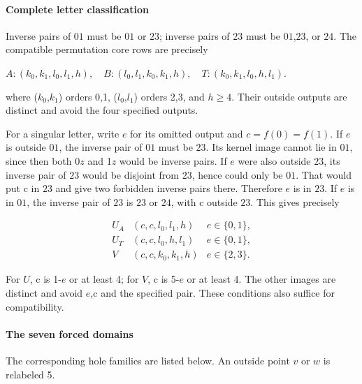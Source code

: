 \documentclass[11pt]{article}
\theoremstyle{definition}
\theoremstyle{plain}
\begin{document}
\paragraph{Complete letter
classification}\label{complete-letter-classification-1}

Inverse pairs of \(01\) must be \(01\) or \(23\); inverse pairs of
\(23\) must be \(01\),\(23\), or \(24\). The compatible permutation core rows are
precisely

\(A:(k_0,k_1,l_0,l_1,h),\quad B:(l_0,l_1,k_0,k_1,h),\quad T:(k_0,k_1,l_0,h,l_1).\)

where (\(k_0\),\(k_1\)) orders 0,1, (\(l_0\),\(l_1\)) orders 2,3, and \(h\ge 4\). Their
outside outputs are distinct and avoid the four specified outputs.

For a singular letter, write \(e\) for its omitted output and
\(c=f(0)=f(1)\). If \(e\) is outside \(01\), the inverse pair of \(01\) must be \(23\).
Its kernel image cannot lie in \(01\), since then both 0\(z\) and 1\(z\)
would be inverse pairs. If \(e\) were also outside \(23\), its inverse pair
of \(23\) would be disjoint from \(23\), hence could only be \(01\). That would put
c in \(23\) and give two forbidden inverse pairs there. Therefore \(e\) is
in \(23\). If \(e\) is in \(01\), the inverse pair of \(23\) is \(23\) or \(24\), with c
outside \(23\). This gives precisely

\[
\begin{array}{ccl}U_A&(c,c,l_0,l_1,h)&e\in\{0,1\},\\U_T&(c,c,l_0,h,l_1)&e\in\{0,1\},\\V&(c,c,k_0,k_1,h)&e\in\{2,3\}.\end{array}
\]

For \(U\), c is 1-\(e\) or at least 4; for \(V\), c is 5-\(e\) or at
least 4. The other images are distinct and avoid \(e\),c and the
specified pair. These conditions also suffice for compatibility.

\paragraph{The seven forced domains}\label{the-seven-forced-domains}

The corresponding hole families are listed below. An outside point
\(v\) or \(w\) is relabeled 5.
\end{document}
